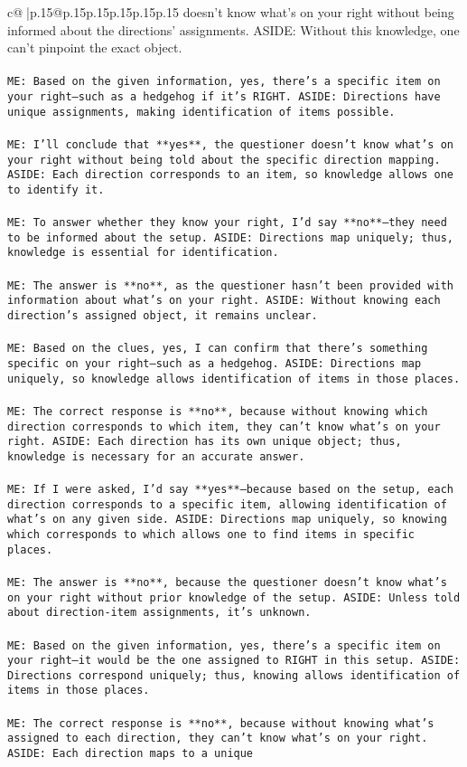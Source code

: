 \documentclass{article}
\begin{document}
{\begin{supertabular}{c@{$\;$}|p{.15\linewidth}@{}p{.15\linewidth}p{.15\linewidth}p{.15\linewidth}p{.15\linewidth}p{.15\linewidth}}
{{{doesn't know what's on your right without being informed about the directions' assignments. ASIDE: Without this knowledge, one can't pinpoint the exact object.\\ \tt \\ \tt ME: Based on the given information, yes, there's a specific item on your right—such as a hedgehog if it's RIGHT. ASIDE: Directions have unique assignments, making identification of items possible.\\ \tt \\ \tt ME: I'll conclude that **yes**, the questioner doesn't know what's on your right without being told about the specific direction mapping. ASIDE: Each direction corresponds to an item, so knowledge allows one to identify it.\\ \tt \\ \tt ME: To answer whether they know your right, I'd say **no**—they need to be informed about the setup. ASIDE: Directions map uniquely; thus, knowledge is essential for identification.\\ \tt \\ \tt ME: The answer is **no**, as the questioner hasn't been provided with information about what's on your right. ASIDE: Without knowing each direction's assigned object, it remains unclear.\\ \tt \\ \tt ME: Based on the clues, yes, I can confirm that there's something specific on your right—such as a hedgehog. ASIDE: Directions map uniquely, so knowledge allows identification of items in those places.\\ \tt \\ \tt ME: The correct response is **no**, because without knowing which direction corresponds to which item, they can't know what's on your right. ASIDE: Each direction has its own unique object; thus, knowledge is necessary for an accurate answer.\\ \tt \\ \tt ME: If I were asked, I'd say **yes**—because based on the setup, each direction corresponds to a specific item, allowing identification of what's on any given side. ASIDE: Directions map uniquely, so knowing which corresponds to which allows one to find items in specific places.\\ \tt \\ \tt ME: The answer is **no**, because the questioner doesn't know what's on your right without prior knowledge of the setup. ASIDE: Unless told about direction-item assignments, it's unknown.\\ \tt \\ \tt ME: Based on the given information, yes, there's a specific item on your right—it would be the one assigned to RIGHT in this setup. ASIDE: Directions correspond uniquely; thus, knowing allows identification of items in those places.\\ \tt \\ \tt ME: The correct response is **no**, because without knowing what's assigned to each direction, they can't know what's on your right. ASIDE: Each direction maps to a unique }}}
\end{supertabular}}
\end{document}
